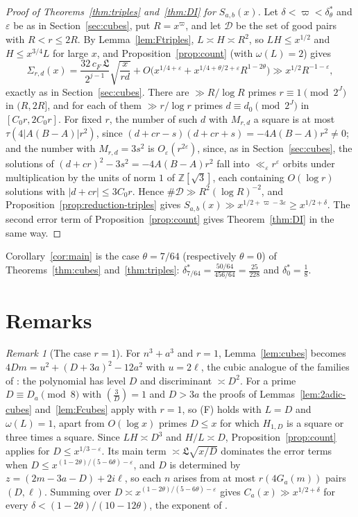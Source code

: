 \documentclass[11pt]{amsart}
\theoremstyle{remark}
\newtheorem{remark}[theorem]{Remark}
\theoremstyle{definition}
\numberwithin{equation}{section}
\newcommand{\Dc}{\mathcal{D}}
\newcommand{\Z}{\mathbb{Z}}
\newcommand{\eps}{\varepsilon}
\newcommand{\Lf}{\mathfrak{L}}
\newcommand{\leg}[2]{\left(\frac{#1}{#2}\right)}
\begin{document}
\begin{proof}[Proof of Theorems~\ref{thm:triples} and~\ref{thm:DI} for $S_{a,b}(x)$]
Let $\delta<\varpi<\delta^*_\theta$ and $\eps$ be as in Section~\ref{sec:cubes}, put $R=x^\varpi$, and let $\Dc$ be the set of good pairs with $R<r\le2R$. By Lemma~\ref{lem:Ftriples}, $L\asymp H\asymp R^2$, so $LH\le x^{1/2}$ and $H\le x^{3/4}L$ for large $x$, and Proposition~\ref{prop:count} (with $\omega(L)=2$) gives
\[
\Sigma_{r,d}(x)=\frac{32\,c_F\,\Lf}{2^{j-1}}\sqrt{\frac x{rd}}+O\bigl(x^{1/4+\eps}+x^{1/4+\theta/2+\eps}R^{1-2\theta}\bigr)\gg x^{1/2}R^{-1-\eps},
\]
exactly as in Section~\ref{sec:cubes}. There are $\gg R/\log R$ primes $r\equiv1\pmod{2^J}$ in $(R,2R]$, and for each of them $\gg r/\log r$ primes $d\equiv d_0\pmod{2^J}$ in $[C_0r,2C_0r]$. For fixed $r$, the number of such $d$ with $M_{r,d}$ a square is at most $\tau(4|A(B-A)|r^2)$, since $(d+cr-s)(d+cr+s)=-4A(B-A)r^2\ne0$; and the number with $M_{r,d}=3s^2$ is $O_\eps(r^{2\eps})$, since, as in Section~\ref{sec:cubes}, the solutions of $(d+cr)^2-3s^2=-4A(B-A)r^2$ fall into $\ll_\eps r^\eps$ orbits under multiplication by the units of norm $1$ of $\Z[\sqrt3]$, each containing $O(\log r)$ solutions with $|d+cr|\le3C_0r$. Hence $\#\Dc\gg R^2(\log R)^{-2}$, and Proposition~\ref{prop:reduction-triples} gives $S_{a,b}(x)\gg x^{1/2+\varpi-3\eps}\ge x^{1/2+\delta}$. The second error term of Proposition~\ref{prop:count} gives Theorem~\ref{thm:DI} in the same way.
\end{proof}

Corollary~\ref{cor:main} is the case $\theta=7/64$ (respectively $\theta=0$) of Theorems~\ref{thm:cubes} and~\ref{thm:triples}: $\delta^*_{7/64}=\frac{50/64}{456/64}=\frac{25}{228}$ and $\delta^*_0=\frac18$.

\section{Remarks}\label{sec:remarks}

\begin{remark}[The case $r=1$]\label{rem:r1}
For $n^3+a^3$ and $r=1$, Lemma~\ref{lem:cubes} becomes $4Dm=u^2+(D+3a)^2-12a^2$ with $u=2\ell$, the cubic analogue of the families of \cite{IC}: the polynomial has level $D$ and discriminant $\asymp D^2$. For a prime $D\equiv D_a\pmod 8$ with $\leg3D=1$ and $D>3a$ the proofs of Lemmas~\ref{lem:2adic-cubes} and~\ref{lem:Fcubes} apply with $r=1$, so \textup{(F)} holds with $L=D$ and $\omega(L)=1$, apart from $O(\log x)$ primes $D\le x$ for which $H_{1,D}$ is a square or three times a square. Since $LH\asymp D^3$ and $H/L\asymp D$, Proposition~\ref{prop:count} applies for $D\le x^{1/3-\eps}$. Its main term $\asymp\Lf\sqrt{x/D}$ dominates the error terms when $D\le x^{(1-2\theta)/(5-6\theta)-\eps}$, and $D$ is determined by $z=(2m-3a-D)+2i\ell$, so each $n$ arises from at most $r(4G_a(m))$ pairs $(D,\ell)$. Summing over $D\asymp x^{(1-2\theta)/(5-6\theta)-\eps}$ gives $C_a(x)\gg x^{1/2+\delta}$ for every $\delta<(1-2\theta)/(10-12\theta)$, the exponent of \cite{IC}.
\end{remark}
\end{document}
